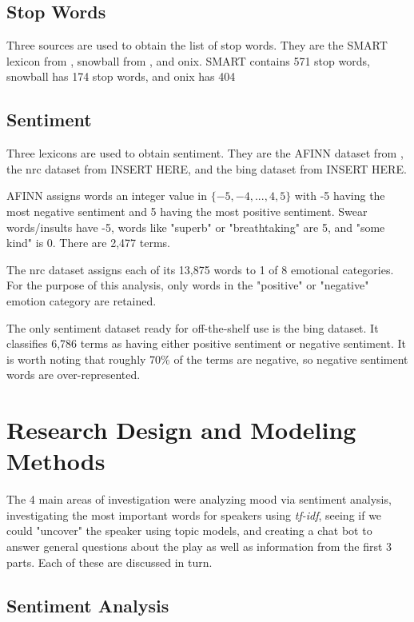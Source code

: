\documentclass{article}
\begin{document}
\subsection{Stop Words}

Three sources are used to obtain the list of stop words. They are the SMART lexicon from \cite{Lewis2004}, snowball from \cite{snowball}, and onix. SMART contains 571 stop words, snowball has 174 stop words, and onix has 404

\subsection{Sentiment}

Three lexicons are used to obtain sentiment. They are the AFINN dataset from \cite{nielsen11}, the nrc dataset from INSERT HERE, and the bing dataset from INSERT HERE.

AFINN assigns words an integer value in $\{-5, -4, ..., 4, 5\}$ with -5 having the most negative sentiment and 5 having the most positive sentiment. Swear words/insults have -5, words like "superb" or "breathtaking" are 5, and "some kind" is 0. There are 2,477 terms. 

The nrc dataset assigns each of its 13,875 words to 1 of 8 emotional categories. For the purpose of this analysis, only words in the "positive" or "negative" emotion category are retained. 

The only sentiment dataset ready for off-the-shelf use is the bing dataset. It classifies 6,786 terms as having either positive sentiment or negative sentiment. It is worth noting that roughly 70\% of the terms are negative, so negative sentiment words are over-represented. 


\section{Research Design and Modeling Methods}

The 4 main areas of investigation were analyzing mood via sentiment analysis, investigating the most important words for speakers using \emph{tf-idf}, seeing if we could "uncover" the speaker using topic models, and creating a chat bot to answer general questions about the play as well as information from the first 3 parts. Each of these are discussed in turn.

\subsection{Sentiment Analysis}
\end{document}
